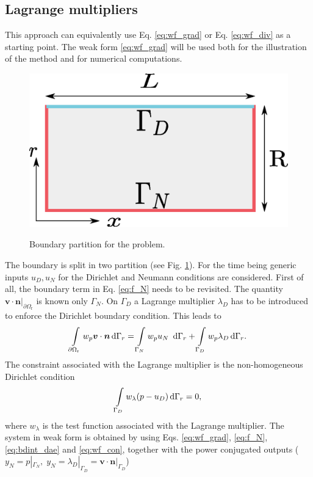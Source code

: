 \documentclass{ifacconf}
\begin{document}
\subsection{Lagrange multipliers}
\label{sec:lgr_mul}
This approach can equivalently use Eq. \eqref{eq:wf_grad} or Eq. \eqref{eq:wf_div} as a starting point. The weak form \eqref{eq:wf_grad} will be used both for the illustration of the method and for numerical computations. 
\begin{figure}[t]%
	\centering
	\includegraphics[width=0.65\columnwidth]{boundary_part.eps} \\
	\caption[bcpart]{Boundary partition for the problem.}
	\label{fig:bc_part}
\end{figure}
The boundary is split in two partition (see Fig. \ref{fig:bc_part}). For the time being generic inputs $u_D, u_N$ for the Dirichlet and Neumann conditions are considered.  First of all, the boundary term in Eq. \eqref{eq:f_N} needs to be revisited. The quantity $\bm{v}\cdot\bm{n}\vert_{\partial \Omega_{\text{r}}}$ is known only $\Gamma_N$. On $\Gamma_D$ a Lagrange multiplier $\lambda_D$ has to be introduced to enforce the Dirichlet boundary condition. This leads to 
\begin{equation}
\label{eq:bdint_dae}
\int_{\partial \Omega_{\text{r}}} w_p \bm{v} \cdot \bm{n} \d{\Gamma_r} = \int_{\Gamma_N} w_p u_N \ \d{\Gamma_r} + \int_{\Gamma_D} w_p \lambda_D \d{\Gamma_r}.
\end{equation}
The constraint associated with the Lagrange multiplier  is the non-homogeneous Dirichlet condition
\begin{equation}
\label{eq:wf_con}
\int_{\Gamma_D} w_\lambda (p - u_D) \d{\Gamma_r} = 0,
\end{equation}
where $w_\lambda$ is the test function associated with the Lagrange multiplier. The system in weak form is obtained by using Eqs. \eqref{eq:wf_grad}, \eqref{eq:f_N}, \eqref{eq:bdint_dae} and \eqref{eq:wf_con}, together with the power conjugated outputs ($y_N = p|_{\Gamma_N}, \; y_N = \lambda_D|_{\Gamma_D} = \bm{v} \cdot \bm{n}|_{\Gamma_D}$)
\end{document}
